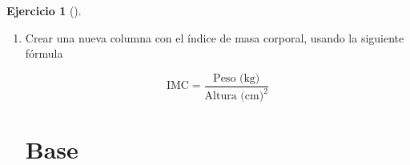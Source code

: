 \documentclass[
  spanish,
  a4paper,
]{scrreport}
\newenvironment{Shaded}{\begin{snugshade}}{\end{snugshade}}
\newcommand{\FunctionTok}[1]{\textcolor[rgb]{0.28,0.35,0.67}{#1}}
\newcommand{\NormalTok}[1]{\textcolor[rgb]{0.00,0.23,0.31}{#1}}
\newcommand{\OtherTok}[1]{\textcolor[rgb]{0.00,0.23,0.31}{#1}}
\newcommand{\StringTok}[1]{\textcolor[rgb]{0.13,0.47,0.30}{#1}}
\theoremstyle{definition}
\newtheorem{exercise}{Ejercicio}[chapter]
\theoremstyle{remark}
\begin{document}
\begin{exercise}[]
\begin{enumerate}
\begin{tcolorbox}
  \section{tidyverse}

  Con la función
  \href{https://readr.tidyverse.org/reference/read_delim.html}{\texttt{read\_csv}}
  del paquete del paquete
  \href{https://readr.tidyverse.org/index.html}{\texttt{readr}} de
  \texttt{tidyverse}.

\begin{Shaded}
\begin{Highlighting}[]
\NormalTok{df }\OtherTok{\textless{}{-}} \FunctionTok{read\_csv}\NormalTok{(}\StringTok{"https://aprendeconalf.es/estadistica{-}practicas{-}r/datos/colesterol.csv"}\NormalTok{)}
\FunctionTok{head}\NormalTok{(df)}
\end{Highlighting}
\end{Shaded}

\begin{verbatim}
# A tibble: 6 x 6
  nombre                        edad sexo   peso altura colesterol
  <chr>                        <dbl> <chr> <dbl>  <dbl>      <dbl>
1 José Luis Martínez Izquierdo    18 H        85   1.79        182
2 Rosa Díaz Díaz                  32 M        65   1.73        232
3 Javier García Sánchez           24 H        NA   1.81        191
4 Carmen López Pinzón             35 M        65   1.7         200
5 Marisa López Collado            46 M        51   1.58        148
6 Antonio Ruiz Cruz               68 H        66   1.74        249
\end{verbatim}

  \end{tcolorbox}
\item
  Crear una nueva columna con el índice de masa corporal, usando la
  siguiente fórmula

  \[
  \mbox{IMC} = \frac{\mbox{Peso (kg)}}{\mbox{Altura (cm)}^2}
  \]

  \begin{tcolorbox}[enhanced jigsaw, titlerule=0mm, arc=.35mm, rightrule=.15mm, opacitybacktitle=0.6, leftrule=.75mm, colframe=quarto-callout-tip-color-frame, toptitle=1mm, breakable, colbacktitle=quarto-callout-tip-color!10!white, bottomrule=.15mm, colback=white, left=2mm, bottomtitle=1mm, opacityback=0, title=\textcolor{quarto-callout-tip-color}{\faLightbulb}\hspace{0.5em}{Solución}, toprule=.15mm, coltitle=black]

  \section{Base}


\end{tcolorbox}
\end{enumerate}
\end{exercise}
\end{document}
